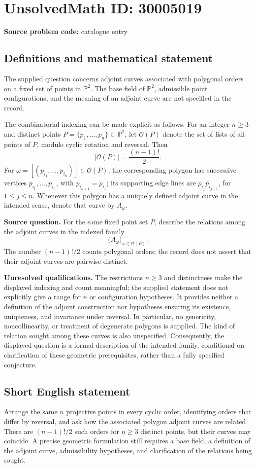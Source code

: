 \documentclass[11pt]{article}
\newcommand{\PP}{\mathbb{P}}
\begin{document}
\section*{UnsolvedMath ID: 30005019}
\textbf{Source problem code:} catalogue entry
\subsection{Definitions and mathematical statement}
The supplied question concerns adjoint curves associated with polygonal orders on a fixed set of points in \(\PP^2\). The base field of \(\PP^2\), admissible point configurations, and the meaning of an adjoint curve are not specified in the record.

The combinatorial indexing can be made explicit as follows. For an integer \(n\geq 3\) and distinct points \(P=\{p_1,\ldots,p_n\}\subset\PP^2\), let \(\mathcal O(P)\) denote the set of lists of all points of \(P\), modulo cyclic rotation and reversal. Then
\[
\lvert\mathcal O(P)\rvert=\frac{(n-1)!}{2}.
\]
For \(\omega=[(p_{i_1},\ldots,p_{i_n})]\in\mathcal O(P)\), the corresponding polygon has successive vertices \(p_{i_1},\ldots,p_{i_n}\), with \(p_{i_{n+1}}=p_{i_1}\); its supporting edge lines are \(\overline{p_{i_j}p_{i_{j+1}}}\), for \(1\leq j\leq n\). Whenever this polygon has a uniquely defined adjoint curve in the intended sense, denote that curve by \(A_\omega\).

\textbf{Source question.} For the same fixed point set \(P\), describe the relations among the adjoint curves in the indexed family
\[
\bigl(A_\omega\bigr)_{\omega\in\mathcal O(P)}.
\]
The number \((n-1)!/2\) counts polygonal orders; the record does not assert that their adjoint curves are pairwise distinct.

\textbf{Unresolved qualifications.} The restrictions \(n\geq3\) and distinctness make the displayed indexing and count meaningful; the supplied statement does not explicitly give a range for \(n\) or configuration hypotheses. It provides neither a definition of the adjoint construction nor hypotheses ensuring its existence, uniqueness, and invariance under reversal. In particular, no genericity, noncollinearity, or treatment of degenerate polygons is supplied. The kind of relation sought among these curves is also unspecified. Consequently, the displayed question is a formal description of the intended family, conditional on clarification of these geometric prerequisites, rather than a fully specified conjecture.
\subsection{Short English statement}
Arrange the same \(n\) projective points in every cyclic order, identifying orders that differ by reversal, and ask how the associated polygon adjoint curves are related. There are \((n-1)!/2\) such orders for \(n\geq3\) distinct points, but their curves may coincide. A precise geometric formulation still requires a base field, a definition of the adjoint curve, admissibility hypotheses, and clarification of the relations being sought.
\end{document}
